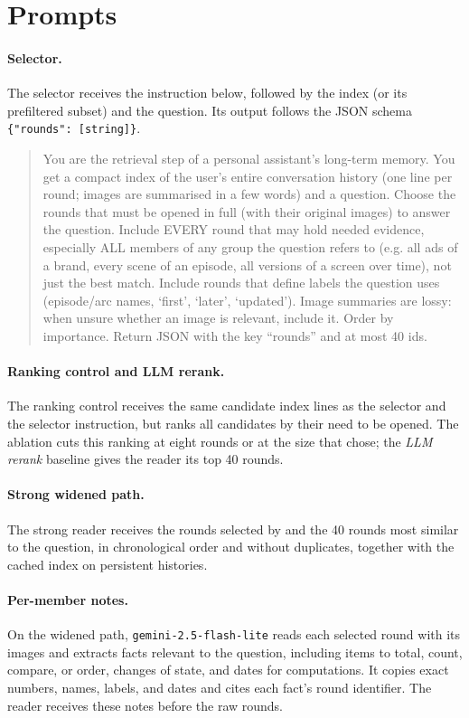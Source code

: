\section{Prompts}
\label{app:prompts}

\paragraph{Selector.} The \qss{} selector receives the instruction below, followed by the index (or its prefiltered subset) and the question. Its output follows the JSON schema \texttt{\{"rounds": [string]\}}.

\begin{quote}\small
You are the retrieval step of a personal assistant's long-term memory. You get a compact index of the user's entire conversation history (one line per round; images are summarised in a few words) and a question. Choose the rounds that must be opened in full (with their original images) to answer the question. Include EVERY round that may hold needed evidence, especially ALL members of any group the question refers to (e.g. all ads of a brand, every scene of an episode, all versions of a screen over time), not just the best match. Include rounds that define labels the question uses (episode/arc names, `first', `later', `updated'). Image summaries are lossy: when unsure whether an image is relevant, include it. Order by importance. Return JSON with the key ``rounds'' and at most 40 ids.
\end{quote}

\paragraph{Ranking control and LLM rerank.} The ranking control receives the same candidate index lines as the selector and the selector instruction, but ranks all candidates by their need to be opened. The ablation cuts this ranking at eight rounds or at the size that \qss{} chose; the \emph{LLM rerank} baseline gives the reader its top 40 rounds.

\paragraph{Strong widened path.} The strong reader receives the rounds selected by \qss{} and the 40 rounds most similar to the question, in chronological order and without duplicates, together with the cached index on persistent histories.

\paragraph{Per-member notes.} On the widened path, \texttt{gemini-2.5-flash-lite} reads each selected round with its images and extracts facts relevant to the question, including items to total, count, compare, or order, changes of state, and dates for computations. It copies exact numbers, names, labels, and dates and cites each fact's round identifier. The reader receives these notes before the raw rounds.

